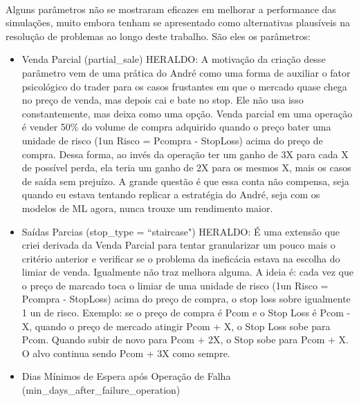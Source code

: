 \paragraph{} Alguns parâmetros não se mostraram eficazes em melhorar a performance das simulações, muito embora tenham se apresentado como alternativas plausíveis na resolução de problemas ao longo deste trabalho. São eles os parâmetros:

\begin{itemize}
    \item Venda Parcial (partial\_sale)
    \color{red} HERALDO: A motivação da criação desse parâmetro vem de uma prática do André como uma forma de auxiliar o fator psicológico do trader para os casos frustantes em que o mercado quase chega no preço de venda, mas depois cai e bate no stop. Ele não usa isso constantemente, mas deixa como uma opção. Venda parcial em uma operação é vender 50\% do volume de compra adquirido quando o preço bater uma unidade de risco (1un Risco = Pcompra - StopLoss) acima do preço de compra. Dessa forma, ao invés da operação ter um ganho de 3X para cada X de possível perda, ela teria um ganho de 2X para os mesmos X, mais os casos de saída sem prejuízo. A grande questão é que essa conta não compensa, seja quando eu estava tentando replicar a estratégia do André, seja com os modelos de ML agora, nunca trouxe um rendimento maior. 

    \item Saídas Parcias (stop\_type = ``staircase")
    \color{red} HERALDO: É uma extensão que criei derivada da Venda Parcial para tentar granularizar um pouco mais o critério anterior e verificar se o problema da ineficácia estava na escolha do limiar de venda. Igualmente não traz melhora alguma. A ideia é: cada vez que o preço de marcado toca o limiar de uma unidade de risco (1un Risco = Pcompra - StopLoss) acima do preço de compra, o stop loss sobre igualmente 1 un de risco. Exemplo: se o preço de compra é Pcom e o Stop Loss é Pcom - X, quando o preço de mercado atingir Pcom + X, o Stop Loss sobe para Pcom. Quando subir de novo para Pcom + 2X, o Stop sobe para Pcom + X. O alvo continua sendo Pcom + 3X como sempre. 

    \item Dias Mínimos de Espera após Operação de Falha (min\_days\_after\_failure\_operation)


\end{itemize}
